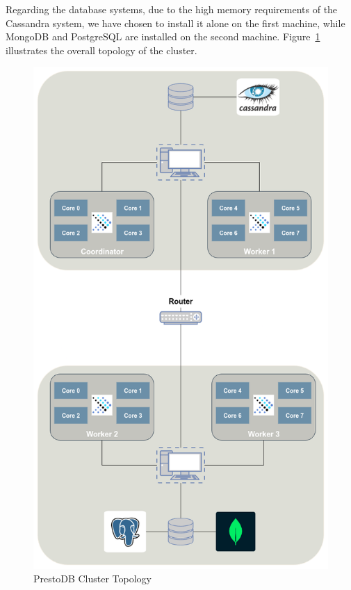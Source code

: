 \documentclass[conference]{IEEEtran}
\begin{document}
Regarding the database systems, due to the high memory requirements of the Cassandra system, we have chosen to install it alone on the first machine, while MongoDB and PostgreSQL are installed on the second machine. Figure~\ref{fig:cluster_topology} illustrates the overall topology of the cluster.

\begin{figure}[htbp]
    \centering
    \includegraphics[width=\linewidth]{figures/cluster_topology.png}
    \caption{PrestoDB Cluster Topology }
    \label{fig:cluster_topology}
\end{figure}
\end{document}

